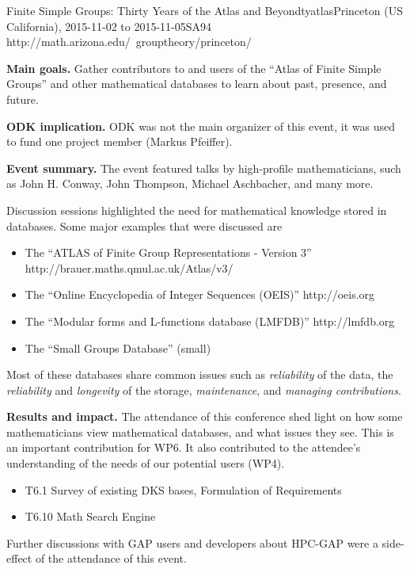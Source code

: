 \begin{event}{Finite Simple Groups: Thirty Years of the Atlas and
    Beyond}{tyatlas}{Princeton (US California), 2015-11-02 to 2015-11-05}{SA}{94
    }{http://math.arizona.edu/~grouptheory/princeton/}

\textbf{Main goals.} Gather contributors to and users of the ``Atlas of Finite
Simple Groups'' and other mathematical databases to learn about past, presence,
and future.

\textbf{ODK implication.} ODK was not the main organizer of this event, it was used to fund
one project member (Markus Pfeiffer).

\textbf{Event summary.} The event featured talks by high-profile mathematicians,
such as John H. Conway, John Thompson, Michael Aschbacher, and many more.

Discussion sessions highlighted the need for mathematical knowledge
stored in databases. Some major examples that were discussed are
\begin{itemize}
  \item The ``ATLAS of Finite Group Representations - Version 3''
    http://brauer.maths.qmul.ac.uk/Atlas/v3/
  \item The ``Online Encyclopedia of Integer Sequences (OEIS)''
    http://oeis.org
  \item The ``Modular forms and L-functions database (LMFDB)''
    http://lmfdb.org
  \item The ``Small Groups Database'' (small)
\end{itemize}

Most of these databases share common issues such as \emph{reliability} of the
data, the \emph{reliability} and \emph{longevity} of the storage,
\emph{maintenance}, and \emph{managing contributions}.
    
\textbf{Results and impact.} 
The attendance of this conference shed light on how some mathematicians view
mathematical databases, and what issues they see. This is an important
contribution for WP6. It also contributed to the attendee's understanding of the
needs of our potential users (WP4).

\begin{itemize}
\item T6.1 Survey of existing DKS bases, Formulation of Requirements
\item T6.10 Math Search Engine

\end{itemize}

Further discussions with GAP users and developers about HPC-GAP were a
side-effect of the attendance of this event. 

\end{event}